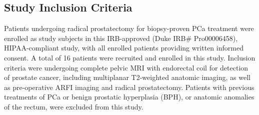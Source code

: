 \subsection{Study Inclusion Criteria}
Patients undergoing radical prostatectomy for biopsy-proven PCa treatment were
enrolled as study subjects in this IRB-approved (Duke IRB\# Pro00006458),
HIPAA-compliant study, with all enrolled patients providing written informed
consent.  A total of 16 patients were recruited and enrolled in this study.
Inclusion criteria were undergoing complete pelvic MRI with endorectal coil for
detection of prostate cancer, including multiplanar T2-weighted anatomic
imaging, as well as pre-operative ARFI imaging and radical prostatectomy.
Patients with previous treatments of PCa or benign prostatic hyperplasia (BPH),
or anatomic anomalies of the rectum, were excluded from this study. 
